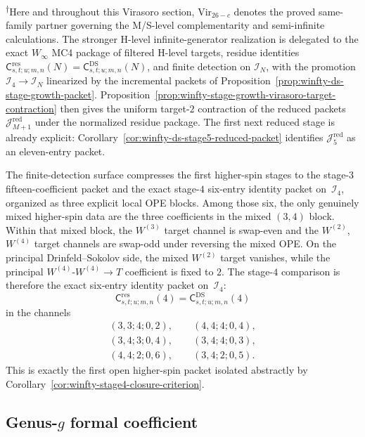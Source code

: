 \textsuperscript{$\dagger$}Here and throughout this Virasoro section,
$\mathrm{Vir}_{26-c}$ denotes the proved same-family partner governing
the M/S-level complementarity and semi-infinite calculations.
The stronger H-level infinite-generator realization is delegated to the
exact $W_\infty$ MC4 package of filtered H-level targets, residue
identities
$\mathsf{C}^{\mathrm{res}}_{s,t;u;m,n}(N)
=\mathsf{C}^{\mathrm{DS}}_{s,t;u;m,n}(N)$,
and finite detection on $\mathcal{I}_N$, with the promotion
$\mathcal{I}_4\to\mathcal{I}_N$ linearized by the incremental packets
of Proposition~\ref{prop:winfty-ds-stage-growth-packet}.
Proposition~\ref{prop:winfty-stage-growth-virasoro-target-contraction}
then gives the uniform target-$2$ contraction of the reduced packets
$\mathcal{J}_{M+1}^{\mathrm{red}}$ under the normalized residue
package. The first next reduced stage is already explicit:
Corollary~\ref{cor:winfty-ds-stage5-reduced-packet} identifies
$\mathcal{J}_5^{\mathrm{red}}$ as an eleven-entry packet.

The finite-detection surface compresses the first higher-spin stages
to the stage-$3$ fifteen-coefficient packet and the
exact stage-$4$ six-entry identity packet on~$\mathcal{I}_4$, organized
as three explicit local OPE blocks. Among those six, the only genuinely
mixed higher-spin data are
the three coefficients in the mixed $(3,4)$ block. Within that mixed
block, the $W^{(3)}$ target channel is swap-even and the
$W^{(2)}$, $W^{(4)}$ target channels are swap-odd under reversing the
mixed OPE. On the principal Drinfeld--Sokolov side, the mixed
$W^{(2)}$ target vanishes, while the principal
$W^{(4)}$-$W^{(4)}\to T$ coefficient is fixed to $2$. The
stage-$4$ comparison is therefore the exact six-entry identity packet
on~$\mathcal{I}_4$:
\[
\mathsf{C}^{\mathrm{res}}_{s,t;u;m,n}(4)
=
\mathsf{C}^{\mathrm{DS}}_{s,t;u;m,n}(4)
\]
in the channels
\[
\begin{gathered}
(3,3;4;0,2),\qquad
(4,4;4;0,4),\\
(3,4;3;0,4),\qquad
(3,4;4;0,3),\\
(4,4;2;0,6),\qquad
(3,4;2;0,5).
\end{gathered}
\]
This is exactly the first open higher-spin packet isolated abstractly
by Corollary~\ref{cor:winfty-stage4-closure-criterion}.

\subsection{\texorpdfstring{Genus-$g$ formal coefficient}{Genus-g formal coefficient}}\label{subsec:vir-free-energy}

